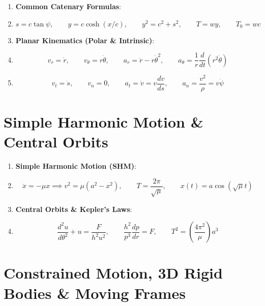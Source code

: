 \begin{keybox}
\begin{enumerate}[leftmargin=1.5em, start=6]
    \item \textbf{Common Catenary Formulas}:
    \item \[ s = c\tan\psi, \qquad y = c\cosh(x/c), \qquad y^2 = c^2+s^2, \qquad T = wy, \qquad T_0 = wc \]
    
    \item \textbf{Planar Kinematics (Polar \& Intrinsic)}:
    \item \[ v_r = \dot{r}, \qquad v_\theta = r\dot{\theta}, \qquad a_r = \ddot{r}-r\dot{\theta}^2, \qquad a_\theta = \frac{1}{r}\frac{d}{dt}(r^2\dot{\theta}) \]
    \item \[ v_t = \dot{s}, \qquad v_n = 0, \qquad a_t = \dot{v} = v\frac{dv}{ds}, \qquad a_n = \frac{v^2}{\rho} = v\dot{\psi} \]
\end{enumerate}
\end{keybox}

\section{Simple Harmonic Motion \& Central Orbits}

\begin{keybox}
\begin{enumerate}[leftmargin=1.5em, start=8]
    \item \textbf{Simple Harmonic Motion (SHM)}:
    \item \[ \ddot{x} = -\mu x \implies v^2 = \mu(a^2-x^2), \qquad T = \frac{2\pi}{\sqrt{\mu}}, \qquad x(t) = a\cos(\sqrt{\mu}t) \]
    
    \item \textbf{Central Orbits \& Kepler's Laws}:
    \item \[ \frac{d^2u}{d\theta^2} + u = \frac{F}{h^2 u^2}, \qquad \frac{h^2}{p^3}\frac{dp}{dr} = F, \qquad T^2 = \left(\frac{4\pi^2}{\mu}\right)a^3 \]
\end{enumerate}
\end{keybox}

\section{Constrained Motion, 3D Rigid Bodies \& Moving Frames}

